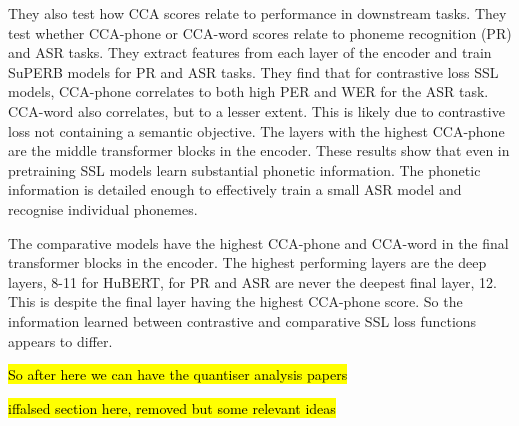 They also test how CCA scores relate to performance in downstream tasks. They test whether CCA-phone or CCA-word scores relate to phoneme recognition (PR) and ASR tasks. They extract features from each layer of the encoder and train SuPERB models \cite{yang2021superb} for PR and ASR tasks. They find that for contrastive loss SSL models, CCA-phone correlates to both high PER and WER for the ASR task. CCA-word also correlates, but to a lesser extent. This is likely due to contrastive loss not containing a semantic objective. The layers with the highest CCA-phone are the middle transformer blocks in the encoder. These results show that even in pretraining SSL models learn substantial phonetic information. The phonetic information is detailed enough to effectively train a small ASR model and recognise individual phonemes.

The comparative models have the highest CCA-phone and CCA-word in the final transformer blocks in the encoder. The highest performing layers are the deep layers, 8-11 for HuBERT, for PR and ASR are never the deepest final layer, 12. This is despite the final layer having the highest CCA-phone score. So the information learned between contrastive and comparative SSL loss functions appears to differ.

\hl{So after here we can have the quantiser analysis papers}


\hl{iffalsed section here, removed but some relevant ideas}

